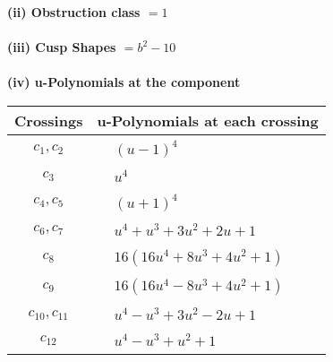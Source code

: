 \documentclass[1p]{elsarticle_modified}
\theoremstyle{definition}
\begin{document}
\flushleft \textbf{(ii) Obstruction class $= 1$}\\~\\
\flushleft \textbf{(iii) Cusp Shapes $= b^2-10$}\\~\\
\newpage\renewcommand{\arraystretch}{1}
\flushleft \textbf{(iv) u-Polynomials at the component}\newline \\
\begin{tabular}{m{50pt}|m{274pt}}
Crossings & \hspace{64pt}u-Polynomials at each crossing \\
\hline $$\begin{aligned}c_{1},c_{2}\end{aligned}$$&$\begin{aligned}
&(u-1)^4
\end{aligned}$\\
\hline $$\begin{aligned}c_{3}\end{aligned}$$&$\begin{aligned}
&u^4
\end{aligned}$\\
\hline $$\begin{aligned}c_{4},c_{5}\end{aligned}$$&$\begin{aligned}
&(u+1)^4
\end{aligned}$\\
\hline $$\begin{aligned}c_{6},c_{7}\end{aligned}$$&$\begin{aligned}
&u^4+u^3+3 u^2+2 u+1
\end{aligned}$\\
\hline $$\begin{aligned}c_{8}\end{aligned}$$&$\begin{aligned}
&16(16 u^4+8 u^3+4 u^2+1)
\end{aligned}$\\
\hline $$\begin{aligned}c_{9}\end{aligned}$$&$\begin{aligned}
&16(16 u^4-8 u^3+4 u^2+1)
\end{aligned}$\\
\hline $$\begin{aligned}c_{10},c_{11}\end{aligned}$$&$\begin{aligned}
&u^4- u^3+3 u^2-2 u+1
\end{aligned}$\\
\hline $$\begin{aligned}c_{12}\end{aligned}$$&$\begin{aligned}
&u^4- u^3+u^2+1
\end{aligned}$\\
\hline
\end{tabular}\\~\\
\end{document}
